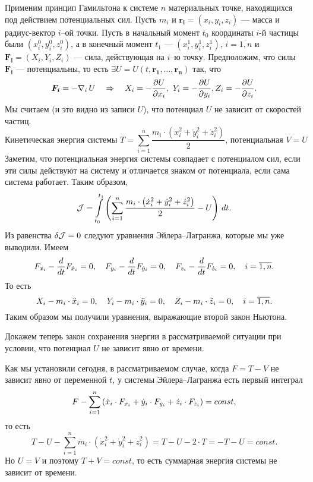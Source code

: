 Применим принцип Гамильтона к системе $n$ материальных точке, находящихся под действием потенциальных сил. Пусть $m_i$ и $\bm{r_i}=(x_i,y_i,z_i)$ --- масса и радиус-вектор $i$--ой точки. Пусть в начальный момент $t_0$ координаты $i$-й частицы были $(x_i^0,y_i^0,z_i^0)$, а в конечный момент $t_1$ --- $(x_i^1,y_i^1,z_i^1)$, $i=\overline{1,n}$ и $\bm{F_i}=(X_i,Y_i,Z_i)$ --- сила, действующая на $i$--ю точку. Предположим, что силы $\bm{F_i}$ --- потенциальны, то есть $\exists U=U(t,\bm{r_1},\ldots,\bm{r_n})$ так, что 
\begin{equation*}
	\hfill\bm{F_i}=-\nabla_i\,U\quad\Rightarrow\quad X_i=-\pder{U}{x_i},\ Y_i=-\pder{U}{y_i}, Z_i=-\pder{U}{z_i}.\hfill
\end{equation*}
Мы считаем (и это видно из записи $U$), что потенциал $U$ не зависит от скоростей частиц. 
\begin{equation*}
	\text{Кинетическая энергия системы }T=\sum\limits_{i=1}^{n}\frac{m_i\cdot\left(\dot{x}_i^2+\dot{y}_i^2+\dot{z}_i^2\right)}{2}\text{, потенциальная }V=U
\end{equation*} 
Заметим, что потенциальная энергия системы совпадает с потенциалом сил, если эти силы действуют на систему и отличается знаком от потенциала, если сама система работает. Таким образом, 
\begin{equation*}
	\hfill\J=\int\limits_{t_0}^{t_1}\left(\sum\limits_{i=1}^{n}\frac{m_i\cdot\left(\dot{x}_i^2+\dot{y}_i^2+\dot{z}_i^2\right)}{2}-U\right)\,dt.\hfill
\end{equation*}
Из равенства $\delta\mathcal{J}=0$ следуют уравнения Эйлера--Лагранжа, которые мы уже выводили. Имеем
\begin{equation*}
	\hfill	F_{x_i}-\der{}{t}F_{\dot{x}_i}=0,\quad F_{y_i}-\der{}{t}F_{\dot{y}_i}=0,\quad F_{z_i}-\der{}{t}F_{\dot{z}_i}=0,\quad i=\overline{1,n}.\hfill
\end{equation*}
То есть
\begin{equation}
	\label{l2:eq:18}
	\hfill X_i-m_i\cdot\ddot{x}_i=0,\quad Y_i-m_i\cdot\ddot{y}_i=0,\quad Z_i-m_i\cdot\ddot{z}_i=0,\quad i=\overline{1,n}.\hfill
\end{equation}
Таким образом мы получили уравнения, выражающие второй закон Ньютона.
\vspace{0.2cm}

Докажем теперь закон сохранения энергии в рассматриваемой ситуации при условии, что потенциал $U$ не зависит явно от времени.

Как мы установили сегодня, в рассматриваемом случае, когда $F=T-V$ не зависит явно от переменной $t$, у системы Эйлера--Лагранжа есть первый интеграл
\begin{equation*}
	\hfill F-\sum\limits_{i=1}^{n}\left(\dot{x}_i\cdot F_{\dot{x}_i}+\dot{y}_i\cdot F_{\dot{y}_i}+\dot{z}_i\cdot F_{\dot{z}_i}\right)=const,\hfill
\end{equation*}
то есть
\begin{equation*}
	T-U-\sum\limits_{i=1}^{n}m_i\cdot\left(\dot{x}_i^2+\dot{y}_i^2+\dot{z}_i^2\right)=T-U-2\cdot T=-T-U=const.
\end{equation*} 
Но $U=V$ и поэтому $T+V=const$, то есть суммарная энергия системы не зависит от времени.


